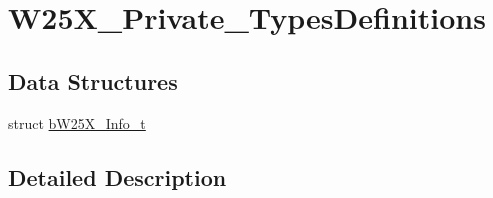 \hypertarget{group___w25_x___private___types_definitions}{}\section{W25\+X\+\_\+\+Private\+\_\+\+Types\+Definitions}
\label{group___w25_x___private___types_definitions}
\subsection*{Data Structures}
\begin{DoxyCompactItemize}
\item 
struct \mbox{\hyperlink{structb_w25_x___info__t}{b\+W25\+X\+\_\+\+Info\+\_\+t}}
\end{DoxyCompactItemize}


\subsection{Detailed Description}
